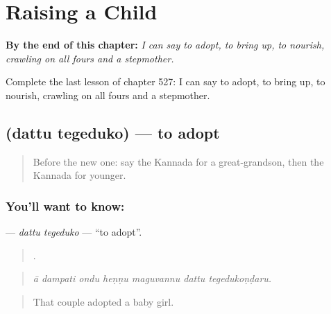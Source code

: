 
\chapter{Raising a Child}
\label{ch:ka-raising-a-child}

\begin{chapteropening}
\textbf{By the end of this chapter:} \emph{I can say to adopt, to bring up, to nourish, crawling on all fours and a stepmother.}

Complete the last lesson of chapter 527: I can say to adopt, to bring up, to nourish, crawling on all fours and a stepmother.
\end{chapteropening}

\section[\texorpdfstring{\kn{ದತ್ತು} \kn{ತೆಗೆದುಕೊ} (dattu tegeduko)}{ದತ್ತು ತೆಗೆದುಕೊ (dattu tegeduko)}]{  (dattu tegeduko) — to adopt}

\label{lesson:KA-C527-dattu-tegeduko}



\begin{quote}
Before the new one: say the Kannada for a great-grandson, then the Kannada for younger.
\end{quote}

\subsection*{You'll want to know:  }
\textbf{ } — \emph{dattu tegeduko} — \textquotedblleft{}to adopt\textquotedblright{}.

\begin{quote}
      .
\end{quote}

\begin{quote}
\emph{ā dampati ondu heṇṇu maguvannu dattu tegedukoṇḍaru.}
\end{quote}

\begin{quote}
That couple adopted a baby girl.
\end{quote}

